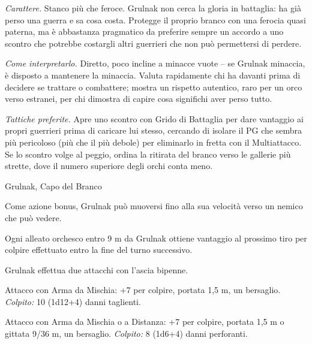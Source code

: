 \textit{Carattere.} Stanco più che feroce. Grulnak non cerca la gloria in battaglia: ha già perso una guerra e sa cosa costa. Protegge il proprio branco con una ferocia quasi paterna, ma è abbastanza pragmatico da preferire sempre un accordo a uno scontro che potrebbe costargli altri guerrieri che non può permettersi di perdere.

\textit{Come interpretarlo.} Diretto, poco incline a minacce vuote -- se Grulnak minaccia, è disposto a mantenere la minaccia. Valuta rapidamente chi ha davanti prima di decidere se trattare o combattere; mostra un rispetto autentico, raro per un orco verso estranei, per chi dimostra di capire cosa significhi aver perso tutto.

\textit{Tattiche preferite.} Apre uno scontro con Grido di Battaglia per dare vantaggio ai propri guerrieri prima di caricare lui stesso, cercando di isolare il PG che sembra più pericoloso (più che il più debole) per eliminarlo in fretta con il Multiattacco. Se lo scontro volge al peggio, ordina la ritirata del branco verso le gallerie più strette, dove il numero superiore degli orchi conta meno.

\begin{DndMonster}[float=!b,width=\columnwidth]{Grulnak, Capo del Branco}

  \DndMonsterBasics[
      armor-class = {15 (cuoio borchiato, scudo)},
      hit-points  = {\DndDice{10d8 + 20}},
      speed       = {9 m},
    ]

  \DndMonsterAbilityScores[
      str = 18, dex = 12, con = 16, int = 8, wis = 11, cha = 14,
    ]

  \DndMonsterDetails[
      skills = {Intimidire +6, Percezione +2},
      senses = {scurovisione 18 m, Percezione passiva 12},
      languages = {Comune, Orchesco},
      challenge = 2,
    ]

  Come azione bonus, Grulnak può muoversi fino alla sua velocità verso un nemico che può vedere.

  Ogni alleato orchesco entro 9 m da Grulnak ottiene vantaggio al prossimo tiro per colpire effettuato entro la fine del turno successivo.


  Grulnak effettua due attacchi con l'ascia bipenne.

  Attacco con Arma da Mischia: +7 per colpire, portata 1,5 m, un bersaglio. \textit{Colpito:} 10 (1d12+4) danni taglienti.

  Attacco con Arma da Mischia o a Distanza: +7 per colpire, portata 1,5 m o gittata 9/36 m, un bersaglio. \textit{Colpito:} 8 (1d6+4) danni perforanti.
\end{DndMonster}

